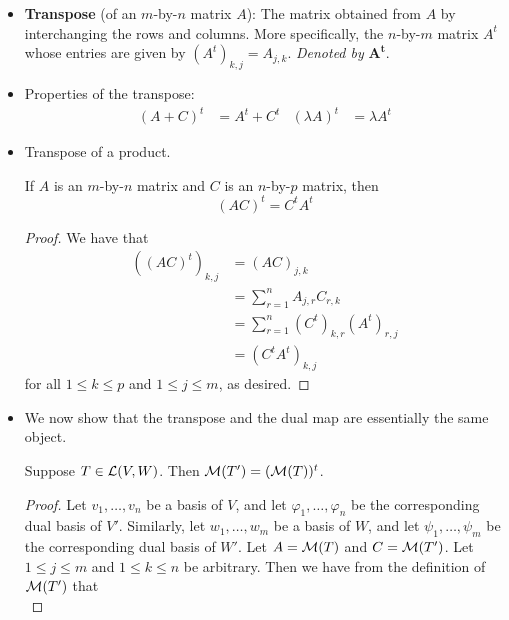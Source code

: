 \documentclass[../main.tex]{subfiles}
\begin{document}
\begin{itemize}
\begin{theorem}
\begin{proof}
            The proof is symmetric in the other direction.
        \end{proof}
    \end{theorem}
    \item {}\textbf{Transpose} (of an $m$-by-$n$ matrix $A$): The matrix obtained from $A$ by interchanging the rows and columns. More specifically, the $n$-by-$m$ matrix $A^t$ whose entries are given by $(A^t)_{k,j}=A_{j,k}$. \emph{Denoted by} $\bm{A^t}$.
    \item Properties of the transpose:
    \begin{align*}
        (A+C)^t &= A^t+C^t&
        (\lambda A)^t &= \lambda A^t
    \end{align*}
    \item Transpose of a product.
    \begin{theorem}
        If $A$ is an $m$-by-$n$ matrix and $C$ is an $n$-by-$p$ matrix, then
        \begin{equation*}
            (AC)^t = C^tA^t
        \end{equation*}
        \begin{proof}
            We have that
            \begin{align*}
                ((AC)^t)_{k,j} &= (AC)_{j,k}\\
                &= \sum_{r=1}^nA_{j,r}C_{r,k}\\
                &= \sum_{r=1}^n(C^t)_{k,r}(A^t)_{r,j}\\
                &= (C^tA^t)_{k,j}
            \end{align*}
            for all $1\leq k\leq p$ and $1\leq j\leq m$, as desired.
        \end{proof}
    \end{theorem}
    \item We now show that the transpose and the dual map are essentially the same object.
    \begin{theorem}\label{trm:matrixTprime}
        Suppose $T\in\mathcal{L}(V,W)$. Then $\mathcal{M}(T')=(\mathcal{M}(T))^t$.
        \begin{proof}
            Let $v_1,\dots,v_n$ be a basis of $V$, and let $\varphi_1,\dots,\varphi_n$ be the corresponding dual basis of $V'$. Similarly, let $w_1,\dots,w_m$ be a basis of $W$, and let $\psi_1,\dots,\psi_m$ be the corresponding dual basis of $W'$. Let $A=\mathcal{M}(T)$ and $C=\mathcal{M}(T')$. Let $1\leq j\leq m$ and $1\leq k\leq n$ be arbitrary. Then we have from the definition of $\mathcal{M}(T')$ that
            \begin{equation*}

\end{equation*}
\end{proof}
\end{theorem}
\end{itemize}
\end{document}

